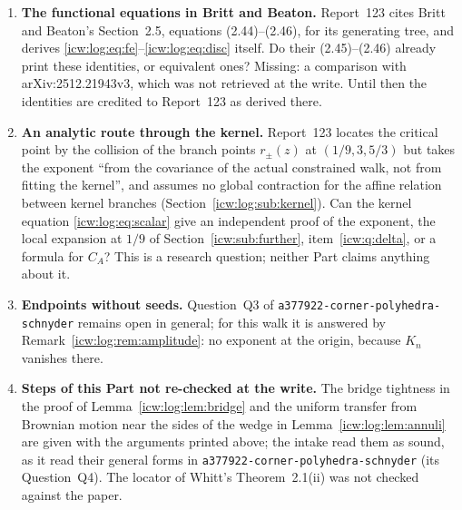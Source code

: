 \documentclass[11pt,letterpaper]{article}
\theoremstyle{remark}\newtheorem{remark}[theorem]{Remark}
\newcommand{\1}{\mathbf1}
\newcommand{\file}[1]{\textup{\nolinkurl{#1}}}
\begin{document}
\begin{enumerate}[label=\arabic*.,ref=\arabic*]
\item\label{icw:log:q:bb} \textbf{The functional equations in Britt and Beaton.} Report~123 cites Britt and Beaton's Section~2.5, equations (2.44)--(2.46), for its generating tree, and derives \eqref{icw:log:eq:fe}--\eqref{icw:log:eq:disc} itself. Do their (2.45)--(2.46) already print these identities, or equivalent ones? Missing: a comparison with arXiv:2512.21943v3, which was not retrieved at the write. Until then the identities are credited to Report~123 as derived there.
\item\label{icw:log:q:kernel} \textbf{An analytic route through the kernel.} Report~123 locates the critical point by the collision of the branch points $r_\pm(z)$ at $(1/9,3,5/3)$ but takes the exponent ``from the covariance of the actual constrained walk, not from fitting the kernel'', and assumes no global contraction for the affine relation between kernel branches (Section~\ref{icw:log:sub:kernel}). Can the kernel equation \eqref{icw:log:eq:scalar} give an independent proof of the exponent, the local expansion at $1/9$ of Section~\ref{icw:sub:further}, item~\ref{icw:q:delta}, or a formula for $C_A$? This is a research question; neither Part claims anything about it.
\item\label{icw:log:q:seeds} \textbf{Endpoints without seeds.} Question~Q3 of \file{a377922-corner-polyhedra-schnyder} remains open in general; for this walk it is answered by Remark~\ref{icw:log:rem:amplitude}: no exponent at the origin, because $K_n$ vanishes there.
\item\label{icw:log:q:unchecked} \textbf{Steps of this Part not re-checked at the write.} The bridge tightness in the proof of Lemma~\ref{icw:log:lem:bridge} and the uniform transfer from Brownian motion near the sides of the wedge in Lemma~\ref{icw:log:lem:annuli} are given with the arguments printed above; the intake read them as sound, as it read their general forms in \file{a377922-corner-polyhedra-schnyder} (its Question~Q4). The locator of Whitt's Theorem~2.1(ii) was not checked against the paper.
\end{enumerate}
\end{document}
